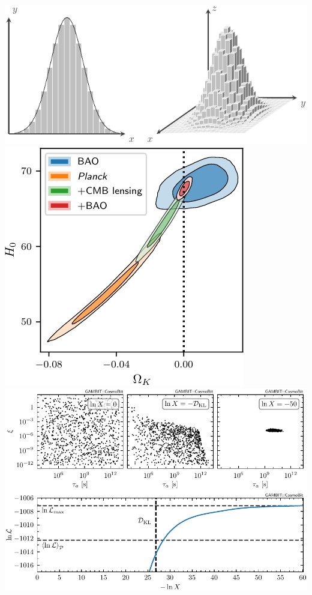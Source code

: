 \documentclass[aspectratio=169]{beamer}
\begin{document}
\begin{frame}
\begin{columns}
    \end{columns}
    \includegraphics[height=0.2\textwidth]{figures/integration}%
    \includegraphics[height=0.2\textwidth]{figures/curvature_3}%
    \includegraphics[height=0.2\textwidth]{figures/ALP_3}%
\end{frame}


\appendix
\end{document}
